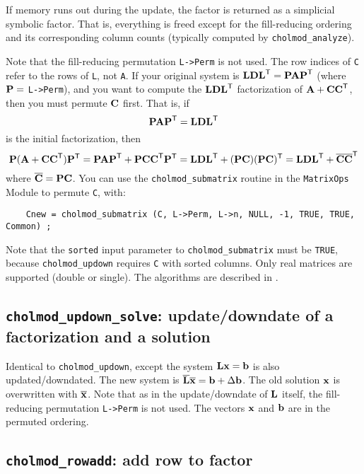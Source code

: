 \documentclass[11pt]{article}
\newcommand{\m}[1]{{\bf{#1}}}       %
\newcommand{\tr}{^{\sf T}}          %
\newcommand{\new}[1]{\overline{#1}}
\begin{document}
If memory runs out during the update, the factor is returned as a simplicial
symbolic factor.  That is, everything is freed except for the fill-reducing
ordering and its corresponding column counts (typically computed by
{\tt cholmod\_analyze}).

Note that the fill-reducing permutation {\tt L->Perm} is not used.  The row
indices of {\tt C} refer to the rows of {\tt L}, not {\tt A}.  If your original
system is $\m{LDL}\tr = \m{PAP}\tr$ (where $\m{P} =$ {\tt L->Perm}), and you
want to compute the $\m{LDL}\tr$ factorization of $\m{A}+\m{CC}\tr$, then you
must permute $\m{C}$ first.  That is, if
\[
    \m{PAP}\tr = \m{LDL}\tr
\]
is the initial factorization, then
\[
\m{P}(\m{A}+\m{CC}\tr)\m{P}\tr
    = \m{PAP}\tr+\m{PCC}\tr\m{P}\tr
    = \m{LDL}\tr + (\m{PC})(\m{PC})\tr
    = \m{LDL}\tr + \new{\m{C}}\new{\m{C}}\tr
\]
where $\new{\m{C}} = \m{PC}$.  You can use the {\tt cholmod\_submatrix} routine
in the {\tt MatrixOps} Module to permute {\tt C}, with:
\begin{verbatim}
    Cnew = cholmod_submatrix (C, L->Perm, L->n, NULL, -1, TRUE, TRUE, Common) ;
\end{verbatim}
Note that the {\tt sorted} input parameter to {\tt cholmod\_submatrix} must be
{\tt TRUE}, because {\tt cholmod\_updown} requires {\tt C} with sorted columns.
Only real matrices are supported (double or single).  The algorithms are
described in \cite{DavisHager99,DavisHager01}.

\subsection{{\tt cholmod\_updown\_solve}: update/downdate of a factorization
and a solution}


Identical to {\tt cholmod\_updown}, except the system $\m{Lx}=\m{b}$ is also
updated/downdated.  The new system is $\new{\m{L}}\new{\m{x}}=\m{b} + \Delta
\m{b}$.  The old solution $\m{x}$ is overwritten with $\new{\m{x}}$.  Note that
as in the update/downdate of $\m{L}$ itself, the fill-reducing permutation
{\tt L->Perm} is not used.  The vectors $\m{x}$ and $\m{b}$ are in the permuted
ordering.

\subsection{{\tt cholmod\_rowadd}: add row to factor}
\end{document}
